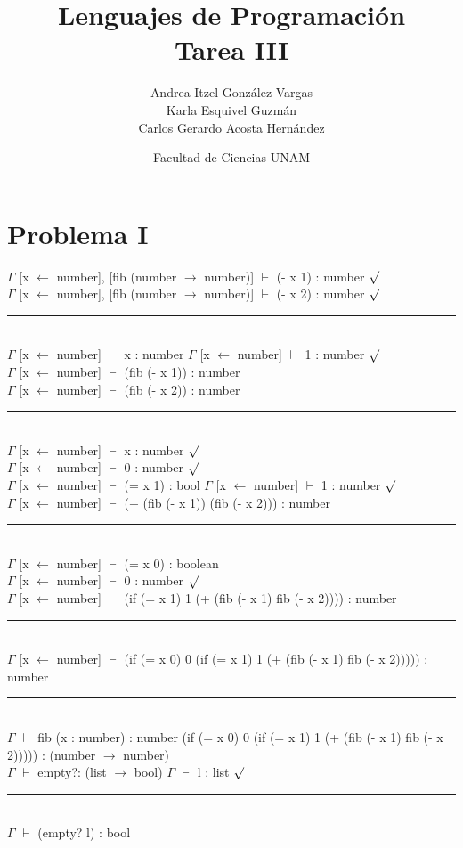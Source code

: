 \documentclass[12pt]{article}
\title{Lenguajes de Programación \\ Tarea III}
\author{Andrea Itzel González Vargas \\ Karla Esquivel Guzmán \\ Carlos Gerardo Acosta Hernández}
\date{Facultad de Ciencias UNAM}
\begin{document}
\maketitle
\section*{Problema I}
\begin{center}
\noindent$\Gamma$ [x $\leftarrow$ number], [fib (number $\rightarrow$ number)] $\vdash$ (- x 1) : number $\surd$ \\
$\Gamma$ [x $\leftarrow$ number], [fib (number $\rightarrow$ number)] $\vdash$ (- x 2) : number $\surd$ \\
\noindent\rule{11cm}{0.4pt} \\
$\Gamma$ [x $\leftarrow$ number] $\vdash$ x : number  $\Gamma$ [x $\leftarrow$ number] $\vdash$ 1 : number $\surd$ \\
$\Gamma$ [x $\leftarrow$ number] $\vdash$ (fib (- x 1)) : number \\ 
$\Gamma$ [x $\leftarrow$ number] $\vdash$ (fib (- x 2)) : number \\
\noindent\rule{11cm}{0.4pt} \\
$\Gamma$ [x $\leftarrow$ number] $\vdash$ x : number $\surd$ \\
$\Gamma$ [x $\leftarrow$ number] $\vdash$ 0 : number $\surd$ \\
$\Gamma$ [x $\leftarrow$ number] $\vdash$ (= x 1) : bool   $\Gamma$ [x $\leftarrow$ number] $\vdash$ 1 : number $\surd$ \\
$\Gamma$ [x $\leftarrow$ number] $\vdash$ (+ (fib (- x 1)) (fib (- x 2))) : number \\
\noindent\rule{11cm}{0.4pt} \\
$\Gamma$ [x $\leftarrow$ number] $\vdash$ (= x 0) : boolean \\
$\Gamma$ [x $\leftarrow$ number] $\vdash$ 0 : number $\surd$ \\
$\Gamma$ [x $\leftarrow$ number] $\vdash$ (if (= x 1) 1 (+ (fib (- x 1) fib (- x 2)))) : number \\
\noindent\rule{11cm}{0.4pt} \\
$\Gamma$ [x $\leftarrow$ number] $\vdash$  (if (= x 0) 0 (if (= x 1) 1 (+ (fib (- x 1) fib (- x 2))))) : number \\
\noindent\rule{11cm}{0.4pt} \\
$\Gamma$ $\vdash$ fib (x : number) : number (if (= x 0) 0 (if (= x 1) 1 (+ (fib (- x 1) fib (- x 2))))) : (number $\rightarrow$ number) \\


$\Gamma$ $\vdash$ empty?: (list $\rightarrow$ bool)   $\Gamma$ $\vdash$ l : list $\surd$
\noindent\rule{11cm}{0.4pt} \\
$\Gamma$ $\vdash$ (empty? l) : bool

\end{center}
\end{document}
